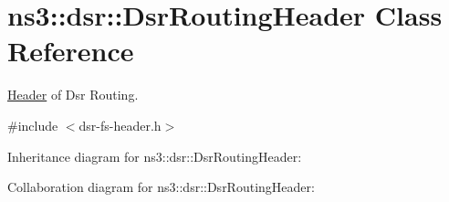 \hypertarget{classns3_1_1dsr_1_1DsrRoutingHeader}{}\section{ns3\+:\+:dsr\+:\+:Dsr\+Routing\+Header Class Reference}
\label{classns3_1_1dsr_1_1DsrRoutingHeader}


\hyperlink{classns3_1_1Header}{Header} of Dsr Routing.  




{\ttfamily \#include $<$dsr-\/fs-\/header.\+h$>$}



Inheritance diagram for ns3\+:\+:dsr\+:\+:Dsr\+Routing\+Header\+:


Collaboration diagram for ns3\+:\+:dsr\+:\+:Dsr\+Routing\+Header\+:
